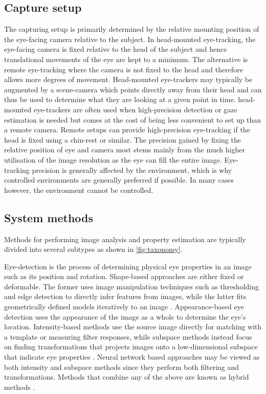 \subsection{Capture setup}
The capturing setup is primarily determined by the relative mounting position of the eye-facing camera relative to the subject. In \gls{head-mounted} \gls{eye-tracking},  the eye-facing camera is fixed relative to the head of the subject and hence translational movements of the eye are kept to a minimum. The alternative is remote \gls{eye-tracking} where the camera is not fixed to the head and therefore allows more degrees of movement. Head-mounted eye-trackers may typically be augmented by a \gls{scene-camera} which points directly away from their head and can thus be used to determine what they are looking at a given point in time. \Gls{head-mounted} \gls{eye-tracker}s are often used when high-precision detection or gaze estimation is needed but comes at the cost of being less convenient to set up than a remote camera. Remote setups can provide high-precision eye-tracking if the head is fixed using a chin-rest or similar. The precision gained by fixing the relative position of eye and camera most stems mainly from the much higher utilisation of the image resolution as the eye can fill the entire image. Eye-tracking precision is generally affected by the environment, which is why controlled environments are generally preferred if possible. In many cases however, the environment cannot be controlled.

\subsection{System methods}
Methods for performing image analysis and property estimation are typically divided into several subtypes as shown in \cref{fig:taxonomy}. 

Eye-detection is the process of determining physical eye properties in an image such as its position and rotation. Shape-based approaches are either fixed or deformable. The former uses image manipulation techniques such as thresholding and edge detection to directly infer features from images, while the latter fits geometrically defined models iteratively to an image \parencite{hansen2009eye}. Appearance-based eye detection uses the appearance of the image as a whole to determine the eye's location. Intensity-based methods use the source image directly for matching with a template or measuring filter responses, while subspace methods instead focus on finding transformations that projects images onto a low-dimensional subspace that indicate eye properties \parencite{hansen2009eye}. Neural network based approaches may be viewed as both intensity and subspace methods since they perform both filtering and transformations. Methods that combine any of the above are known as hybrid methods \parencite{hansen2009eye}. 

